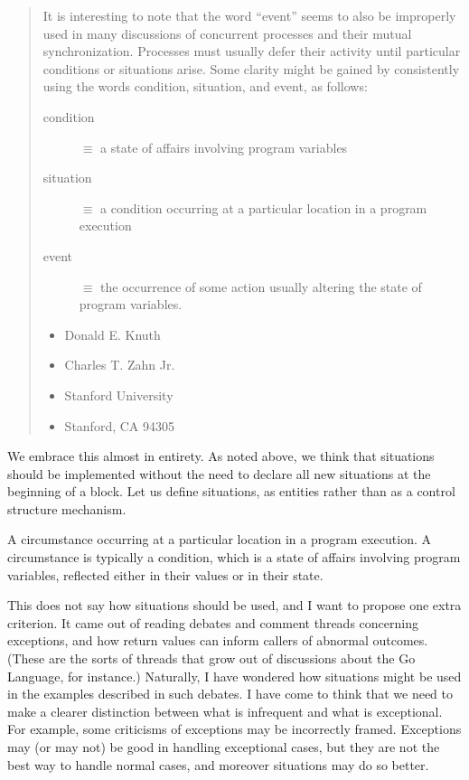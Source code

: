 \documentclass[10pt]{amsart}
\begin{document}
\begin{quotation}
\begin{offside}
It is interesting to note that the word ``event'' seems to also be
improperly used in many discussions of concurrent processes and their
mutual synchronization. Processes must usually defer their activity
until particular conditions or situations arise.  Some clarity might
be gained by consistently using the words condition, situation, and
event, as follows:
\vspace{1ex}%
\renewcommand{\descriptionlabel}[1]{%
  \hspace*{-0.5\labelsep}#1\strut\hspace{-\labelsep}\strut}
\begin{description}
\item[condition]\strut{} $\equiv$ a state of affairs involving program variables
\item[situation]\strut{} $\equiv$ a condition occurring at a particular
  location in a program execution
\item[event]\strut{} $\equiv$ the occurrence of some action usually altering
  the state of program variables.
\end{description}
\vspace{1ex}%
\begin{itemize}
  \item[\strut]Donald E. Knuth
  \item[\strut]Charles T. Zahn Jr.
  \item[\strut]Stanford University
  \item[\strut]Stanford, CA 94305
\end{itemize}
\end{offside}
\end{quotation}
We embrace this almost in entirety.  As noted above, we think that
situations should be implemented without the need to declare all new
situations at the beginning of a block.  Let us define situations, as
entities rather than as a control structure mechanism.
\begin{defn}[Situation]
  A circumstance occurring at a particular location in a program
  execution.  A circumstance is typically a condition, which is a
  state of affairs involving program variables, reflected either in
  their values or in their state.
\end{defn}

This does not say how situations should be used, and I want to propose
one extra criterion.  It came out of reading debates and comment
threads concerning exceptions, and how return values can inform
callers of abnormal outcomes.  (These are the sorts of threads that
grow out of discussions about the Go Language, for instance.)
Naturally, I have wondered how situations might be used in the
examples described in such debates.  I have come to think that we need
to make a clearer distinction between what is infrequent and what is
exceptional.  For example, some criticisms of exceptions may be
incorrectly framed.  Exceptions may (or may not) be good in handling
exceptional cases, but they are not the best way to handle normal
cases, and moreover situations may do so better.
\end{document}
